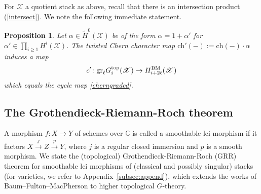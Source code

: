 \documentclass [11pt,oneside,a4paper,mathscr]{amsart}
\newtheorem{prop}[thm]{Proposition}
\theoremstyle{definition}
\renewcommand{\geq}{\geqslant}
\newcommand{\X}{\mathscr{X}}
\begin{document}
For $\X$ a quotient stack as above, recall that there is an intersection product 
(\ref{intersect}). We note the following immediate statement.

\begin{prop}\label{propchprime}
Let $\alpha\in \widetilde{H}^0(\X)$ 
be of the form $\alpha=1+\alpha'$ for $\alpha'\in \prod_{i\geq 1}H^i(\X)$. 
The twisted Chern character map 
$\mathrm{ch}'(-):=\mathrm{ch}(-)\cdot\alpha$
induces a map
\begin{align*}
    c' \colon \mathrm{gr}_{\ell}G_i^{\rm{top}}(\X) \to H_{i+2\ell}^{\rm{BM}}(\X)
\end{align*}
which equals the cycle map \eqref{cherngraded}.
\end{prop}

\subsection{The Grothendieck-Riemann-Roch theorem}

A morphism $f:X\to Y$ of schemes over $\mathbb{C}$ is called a smoothable lci morphism if it factors $X\xrightarrow{j} Z\xrightarrow{p} Y$, where $j$ is a regular closed immersion and $p$ is a smooth morphism.
We state the (topological) Grothendieck-Riemann-Roch (GRR) theorem for smoothable lci morphisms of (classical and possibly singular) stacks (for varieties, we refer to Appendix~\ref{subsec:append}), which extends the works of Baum--Fulton--MacPherson \cite{MR0412190, BF02392091} to higher topological $G$-theory. 
\end{document}
